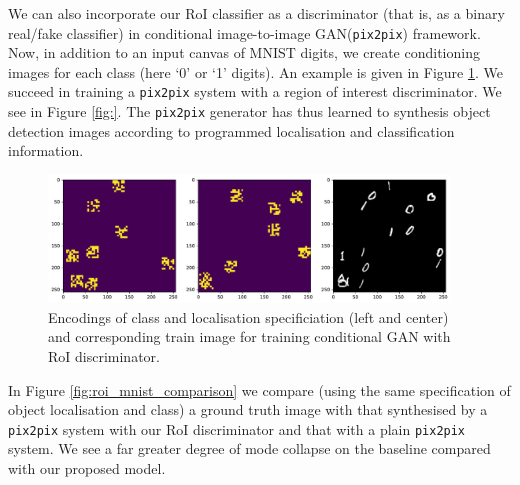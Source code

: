 We can also incorporate our RoI classifier as a discriminator (that is, as a binary real/fake classifier) in conditional image-to-image GAN(\texttt{pix2pix}) framework. Now, in addition to an input canvas of MNIST digits, we create conditioning images for each class (here `0' or `1' digits). An example is given in Figure \ref{fig:roi_prediction}. We succeed in training a \texttt{pix2pix} system with a region of interest discriminator. We see in Figure \ref{fig:}. The \texttt{pix2pix} generator has thus learned to synthesis object detection images according to programmed localisation and classification information.

\begin{figure}[b!]
\centering
\includegraphics[width=0.95\textwidth]{img/roi_pix2pix_canvas.pdf}
\caption{Encodings of class and localisation specificiation (left and center) and corresponding train image for training conditional GAN with RoI discriminator.}
\label{fig:roi_prediction}
\end{figure}

In Figure \ref{fig:roi_mnist_comparison} we compare (using the same specification of object localisation and class) a ground truth image with that synthesised by a \texttt{pix2pix} system with our RoI discriminator and that with a plain \texttt{pix2pix} system. We see a far greater degree of mode collapse on the baseline compared with our proposed model.

